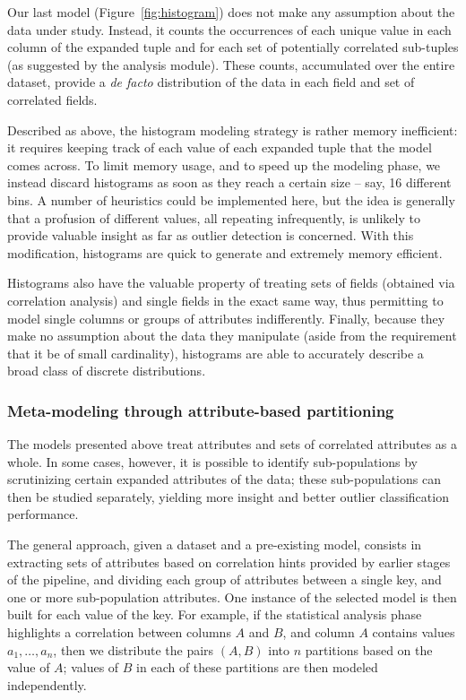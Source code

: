 Our last model (Figure~\ref{fig:histogram}) does not make any assumption about the data under study. Instead, it counts the occurrences of each unique value in each column of the expanded tuple and for each set of potentially correlated sub-tuples (as suggested by the analysis module). These counts, accumulated over the entire dataset, provide a \emph{de facto} distribution of the data in each field and set of correlated fields.

Described as above, the histogram modeling strategy is rather memory inefficient: it requires keeping track of each value of each expanded tuple that the model comes across. To limit memory usage, and to speed up the modeling phase, we instead discard histograms as soon as they reach a certain size -- say, 16 different bins. A number of heuristics could be implemented here, but the idea is generally that a profusion of different values, all repeating infrequently, is unlikely to provide valuable insight as far as outlier detection is concerned. With this modification, histograms are quick to generate and extremely memory efficient.

Histograms also have the valuable property of treating sets of fields (obtained via correlation analysis) and single fields in the exact same way, thus permitting to model single columns or groups of attributes indifferently. Finally, because they make no assumption about the data they manipulate (aside from the requirement that it be of small cardinality), histograms are able to accurately describe a broad class of discrete distributions.

\subsubsection{Meta-modeling through attribute-based partitioning}
\label{sec:partitioning}

The models presented above treat attributes and sets of correlated attributes as a whole. In some cases, however, it is possible to identify sub-populations by scrutinizing certain expanded attributes of the data; these sub-populations can then be studied separately, yielding more insight and better outlier classification performance.

The general approach, given a dataset and a pre-existing model, consists in extracting sets of attributes based on correlation hints provided by earlier stages of the pipeline, and dividing each group of attributes between a single key, and one or more sub-population attributes. One instance of the selected model is then built for each value of the key. For example, if the statistical analysis phase highlights a correlation between columns $A$ and $B$, and column $A$ contains values $a_1, \dots, a_n$, then we distribute the pairs $(A, B)$ into $n$ partitions based on the value of $A$; values of $B$ in each of these partitions are then modeled independently.

